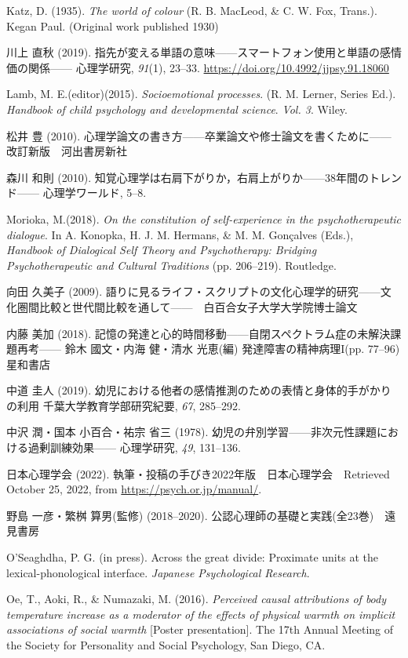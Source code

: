 Katz, D. (1935). \textit{The world of colour} (R. B. MacLeod, \& C. W. Fox, Trans.). Kegan Paul. (Original work published 1930)

川上 直秋 (2019). 指先が変える単語の意味------スマートフォン使用と単語の感情価の関係------ 心理学研究, \textit{91}(1), 23--33. \url{https://doi.org/10.4992/jjpsy.91.18060}

Lamb, M. E.(editor)(2015). \textit{Socioemotional processes}. (R. M. Lerner, Series Ed.). \textit{Handbook of child psychology and developmental science}. \textit{Vol. 3}. Wiley.

松井 豊 (2010). 心理学論文の書き方------卒業論文や修士論文を書くために------ 改訂新版　河出書房新社

森川 和則 (2010). 知覚心理学は右肩下がりか，右肩上がりか------38年間のトレンド------ 心理学ワールド, 5--8.

Morioka, M.(2018). \textit{On the constitution of self-experience in the psychotherapeutic dialogue}. In A. Konopka, H. J. M. Hermans, \& M. M. Gonçalves (Eds.),  \textit{Handbook of Dialogical Self Theory and Psychotherapy: Bridging Psychotherapeutic and Cultural Traditions} (pp. 206--219). Routledge.

向田 久美子 (2009). 語りに見るライフ・スクリプトの文化心理学的研究------文化圏間比較と世代間比較を通して------　白百合女子大学大学院博士論文

内藤 美加 (2018). 記憶の発達と心的時間移動------自閉スペクトラム症の未解決課題再考------ 鈴木 國文・内海 健・清水 光恵(編) 発達障害の精神病理I(pp. 77--96)　星和書店

中道 圭人 (2019). 幼児における他者の感情推測のための表情と身体的手がかりの利用 千葉大学教育学部研究紀要, \textit{67}, 285--292.

中沢 潤・国本 小百合・祐宗 省三 (1978). 幼児の弁別学習------非次元性課題における過剰訓練効果------ 心理学研究, \textit{49}, 131--136.

日本心理学会 (2022). 執筆・投稿の手びき2022年版　日本心理学会　Retrieved October 25, 2022, from \url{https://psych.or.jp/manual/}.

野島 一彦・繁桝 算男(監修) (2018--2020).  公認心理師の基礎と実践(全23巻)　遠見書房

O'Seaghdha, P. G. (in press). Across the great divide: Proximate units at the lexical-phonological interface. \textit{Japanese Psychological Research}.

Oe, T., Aoki, R., \& Numazaki, M. (2016). \textit{Perceived causal attributions of body temperature increase as a moderator of the effects of physical warmth on implicit associations of social warmth} [Poster presentation]. The 17th Annual Meeting of the Society for Personality and Social Psychology, San Diego, CA.

